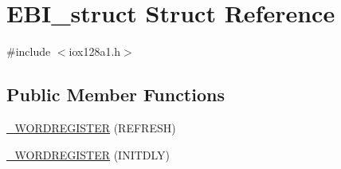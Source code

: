\hypertarget{struct_e_b_i__struct}{
\section{EBI\_\-struct Struct Reference}
\label{struct_e_b_i__struct}
}


{\ttfamily \#include $<$iox128a1.h$>$}

\subsection*{Public Member Functions}
\begin{DoxyCompactItemize}
\item 
\hyperlink{struct_e_b_i__struct_a8e9b2a3d2c3a1a909cb04b3a836e9e56}{\_\-WORDREGISTER} (REFRESH)
\item 
\hyperlink{struct_e_b_i__struct_ad1692132eee654eed052947efd91836d}{\_\-WORDREGISTER} (INITDLY)
\end{DoxyCompactItemize}
